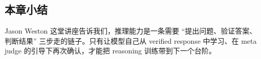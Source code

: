 \documentclass[a4paper]{article}
\begin{document}
\subsection{本章小结}
Jason Weston 这堂讲座告诉我们，推理能力是一条需要 ``提出问题、验证答案、判断结果'' 三步走的链子。只有让模型自己从 verified response 中学习、在 meta judge 的引导下再次确认，才能把 reasoning 训练带到下一个台阶。
\end{document}
